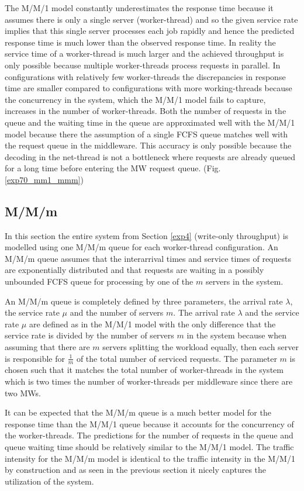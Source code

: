 \documentclass[report.tex]{subfiles}
\begin{document}
The M/M/1 model constantly underestimates the response time because it assumes there is only a single server (worker-thread) and so the given service rate implies that this single server processes each job rapidly and hence the predicted response time is much lower than the observed response time. In reality the service time of a worker-thread is much larger and the achieved throughput is only possible because multiple worker-threads process requests in parallel.
In configurations with relatively few worker-threads the discrepancies in response time are smaller compared to configurations with more working-threads because the concurrency in the system, which the M/M/1 model fails to capture, increases in the number of worker-threads.
Both the number of requests in the queue and the waiting time in the queue are approximated well with the M/M/1 model because there the assumption of a single FCFS queue matches well with the request queue in the middleware. This accuracy is only possible because the decoding in the net-thread is not a bottleneck where requests are already queued for a long time before entering the MW request queue. (Fig. \ref{exp70_mm1_mmm})

\subsection{M/M/m}

In this section the entire system from Section \ref{exp4} (write-only throughput) is modelled using one M/M/m queue for each worker-thread configuration. An M/M/m queue assumes that the interarrival times and service times of requests are exponentially distributed and that requests are waiting in a possibly unbounded FCFS queue for processing by one of the $m$ servers in the system.

An M/M/m queue is completely defined by three parameters, the arrival rate $\lambda$, the service rate $\mu$ and the number of servers $m$.
The arrival rate $\lambda$ and the service rate $\mu$ are defined as in the M/M/1 model with the only difference that the service rate is divided by the number of servers $m$ in the system because when assuming that there are $m$ servers splitting the workload equally, then each server is responsible for $\frac{1}{m}$ of the total number of serviced requests. The parameter $m$ is chosen such that it matches the total number of worker-threads in the system which is two times the number of worker-threads per middleware since there are two MWs.

It can be expected that the M/M/m queue is a much better model for the response time than the M/M/1 queue because it accounts for the concurrency of the worker-threads. The predictions for the number of requests in the queue and queue waiting time should be relatively similar to the M/M/1 model. The traffic intensity for the M/M/m model is identical to the traffic intensity in the M/M/1 by construction and as seen in the previous section it nicely captures the utilization of the system.
\end{document}
